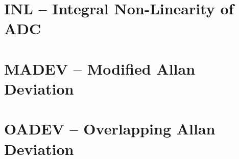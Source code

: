 \documentclass[12pt,a4paper,oneside]{report} %
\begin{document}
\chapter{INL -- Integral Non-Linearity of ADC} %
\section*{\infosection} %

\section*{\examplesection} %


\chapter{MADEV -- Modified Allan Deviation} %
\section*{\infosection} %

\section*{\examplesection} %


\chapter{OADEV -- Overlapping Allan Deviation} %
\section*{\infosection} %

\section*{\examplesection} %

\end{document}

